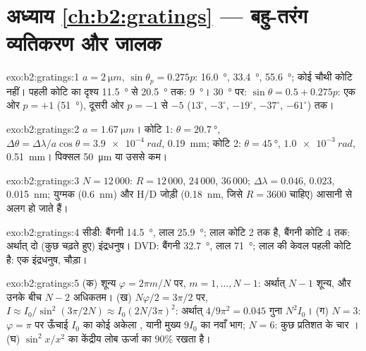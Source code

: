 \section*{अध्याय \ref{ch:b2:gratings} --- बहु-तरंग व्यतिकरण और जालक}

\begin{solution}{exo:b2:gratings:1}
$a = \qty{2}{\micro m}$, $\sin\theta_p = 0.275p$: \qty{16.0}{\degree}, \qty{33.4}{\degree}, \qty{55.6}{\degree};
कोई चौथी कोटि नहीं। पहली कोटि का दृश्य \qty{11.5}{\degree} से \qty{20.5}{\degree} तक:
\qty{9}{\degree}। \qty{30}{\degree} पर: $\sin\theta = 0.5 + 0.275p$: एक ओर $p = +1$ (\qty{51}{\degree}),
दूसरी ओर $p = -1$ से $-5$ ($13^\circ$, $-3^\circ$, $-19^\circ$, $-37^\circ$, $-61^\circ$)
तक।
\end{solution}

\begin{solution}{exo:b2:gratings:2}
$a = \qty{1.67}{\micro m}$। कोटि 1: $\theta = \qty{20.7}{\degree}$, $\Delta\theta = \Delta\lambda/a\cos\theta =
\qty{3.9e-4}{rad}$, \qty{0.19}{mm}; कोटि 2: $\theta = \qty{45}{\degree}$, $\qty{1.0e-3}{rad}$,
\qty{0.51}{mm}। पिक्सल \qty{50}{\micro m} या उससे कम।
\end{solution}

\begin{solution}{exo:b2:gratings:3}
$N = 12\,000$: $R = 12\,000$, $24\,000$, $36\,000$; $\Delta\lambda = 0.046$, $0.023$, \qty{0.015}{nm};
युग्मक (\qty{0.6}{nm}) और H/D जोड़ी (\qty{0.18}{nm}, जिसे $R = 3600$ चाहिए)
आसानी से अलग हो जाते हैं।
\end{solution}

\begin{solution}{exo:b2:gratings:4}
सीडी: बैंगनी \qty{14.5}{\degree}, लाल \qty{25.9}{\degree}; लाल कोटि 2 तक है, बैंगनी
कोटि 4 तक: अर्थात् दो (कुछ चढ़ते हुए) इंद्रधनुष। DVD: बैंगनी \qty{32.7}{\degree}, लाल
\qty{71}{\degree}; लाल की केवल पहली कोटि है: एक इंद्रधनुष, चौड़ा।
\end{solution}

\begin{solution}{exo:b2:gratings:5}
(क) शून्य $\varphi = 2\pi m/N$ पर, $m = 1, \dots, N - 1$: अर्थात् $N - 1$ शून्य, और उनके बीच $N - 2$
अधिकतम। (ख) $N\varphi/2 = 3\pi/2$ पर, $I \approx I_0/\sin^2(3\pi/2N) \approx I_0(2N/3\pi)^2$:
अर्थात् $4/9\pi^2 = 0.045$ गुना $N^2I_0$। (ग) $N = 3$: $\varphi = \pi$ पर ऊँचाई $I_0$ का कोई
अकेला , यानी मुख्य $9I_0$ का नवाँ भाग; $N = 6$: कुछ प्रतिशत के चार
। (घ) $\sin^2x/x^2$ का केंद्रीय लोब
ऊर्जा का $90\%$ रखता है।
\end{solution}

